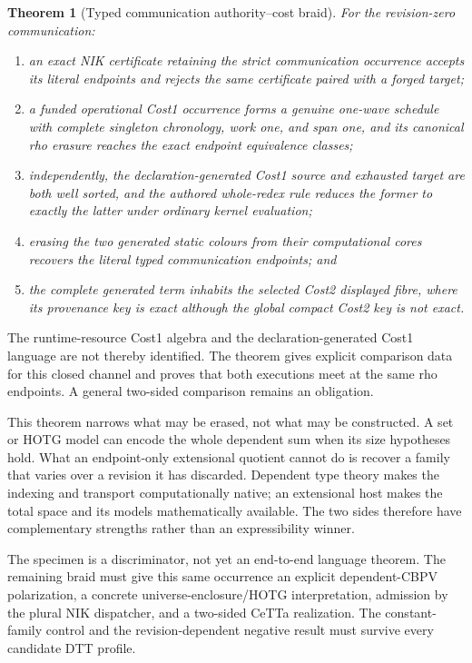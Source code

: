 \documentclass[11pt]{article}
\newtheorem{theorem}{Theorem}
\theoremstyle{definition}
\theoremstyle{remark}
\begin{document}
\begin{theorem}[Typed communication authority--cost braid]
For the revision-zero communication:
\begin{enumerate}[label=(\roman*)]
\item an exact NIK certificate retaining the strict communication occurrence
  accepts its literal endpoints and rejects the same certificate paired with a
  forged target;
\item a funded operational Cost1 occurrence forms a genuine one-wave schedule
  with complete singleton chronology, work one, and span one, and its canonical
  rho erasure reaches the exact endpoint equivalence classes;
\item independently, the declaration-generated Cost1 source and exhausted
  target are both well sorted, and the authored whole-redex rule reduces the
  former to exactly the latter under ordinary kernel evaluation;
\item erasing the two generated static colours from their computational cores
  recovers the literal typed communication endpoints; and
\item the complete generated term inhabits the selected Cost2 displayed fibre,
  where its provenance key is exact although the global compact Cost2 key is
  not exact.
\end{enumerate}
\end{theorem}

The runtime-resource Cost1 algebra and the declaration-generated Cost1
language are not thereby identified.  The theorem gives explicit comparison
data for this closed channel and proves that both executions meet at the same
rho endpoints.  A general two-sided comparison remains an obligation.

This theorem narrows what may be erased, not what may be constructed.  A set or
HOTG model can encode the whole dependent sum when its size hypotheses hold.
What an endpoint-only extensional quotient cannot do is recover a family that
varies over a revision it has discarded.  Dependent type theory makes the
indexing and transport computationally native; an extensional host makes the
total space and its models mathematically available.  The two sides therefore
have complementary strengths rather than an expressibility winner.

The specimen is a discriminator, not yet an end-to-end language theorem.  The
remaining braid must give this same occurrence an explicit dependent-CBPV
polarization, a concrete universe-enclosure/HOTG interpretation, admission by
the plural NIK dispatcher, and a two-sided CeTTa realization.  The
constant-family control and the revision-dependent negative result must survive
every candidate DTT profile.
\end{document}
